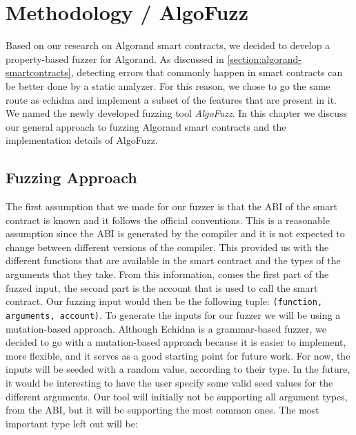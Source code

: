 
\chapter{Methodology / AlgoFuzz}\label{chapter:methodology}
Based on our research on Algorand smart contracts, we decided to develop a property-based fuzzer for Algorand.
As discussed in \ref{section:algorand-smartcontracts}, detecting errors that commonly happen in smart contracts can be better done by a static analyzer.
For this reason, we chose to go the same route as echidna and implement a subset of the features that are present in it. We named the newly developed fuzzing tool \textit{AlgoFuzz}.
In this chapter we discuss our general approach to fuzzing Algorand smart contracts and the implementation details of AlgoFuzz.

\section{Fuzzing Approach}
The first assumption that we made for our fuzzer is that the ABI of the smart contract is known and it follows the official conventions.
This is a reasonable assumption since the ABI is generated by the compiler and it is not expected to change between different versions of the compiler.
This provided us with the different functions that are available in the smart contract and the types of the arguments that they take.
From this information, comes the first part of the fuzzed input, the second part is the account that is used to call the smart contract.
Our fuzzing input would then be the following tuple: \texttt{(function, arguments, account)}.
To generate the inputs for our fuzzer we will be using a mutation-based approach.
Although Echidna is a grammar-based fuzzer, we decided to go with a mutation-based approach because it is easier to implement, more flexible, and it serves as a good starting point for future work.
For now, the inputs will be seeded with a random value, according to their type.
In the future, it would be interesting to have the user specify some valid seed values for the different arguments.
Our tool will initially not be supporting all argument types, from the ABI, but it will be supporting the most common ones.
The most important type left out will be:

